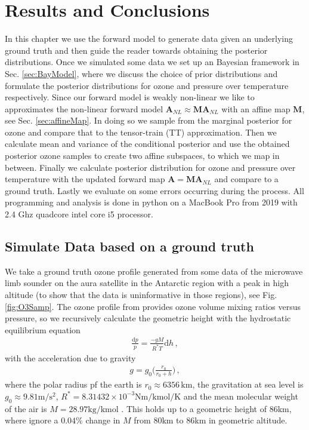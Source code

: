 \chapter{Results and Conclusions}
\label{ch:res}
In this chapter we use the forward model to generate data given an underlying ground truth and then guide the reader towards obtaining the posterior distributions.
Once we simulated some data we set up an Bayesian framework in Sec. \ref{sec:BayModel}, where we discuss the choice of prior distributions and formulate the posterior distributions for ozone and pressure over temperature respectively.
Since our forward model is weakly non-linear we like to approximates the non-linear forward model $\bm{A}_{NL} \approx \bm{M} \bm{A}_{NL}$ with an affine map $\bm{M}$, see Sec. \ref{sec:affineMap}.
In doing so we sample from the marginal posterior for ozone and compare that to the tensor-train (TT) approximation.
Then we calculate mean and variance of the conditional posterior and use the obtained posterior ozone samples to create two affine subspaces, to which we map in between.
Finally we calculate posterior distribution for ozone and pressure over temperature with the updated forward map $\bm{A} = \bm{M} \bm{A}_{NL}$ and compare to a ground truth.
Lastly we evaluate on some errors occurring during the process.
All programming and analysis is done in python on a MacBook Pro from 2019 with 2.4 Ghz quadcore intel core i5 processor.

\section{Simulate Data based on a ground truth}
We take a ground truth ozone profile generated from some data \cite{MLSdata} of the microwave limb sounder on the aura satellite in the Antarctic region with a peak in high altitude (to show that the data is uninformative in those regions), see Fig. \ref{fig:O3Samp}.
The ozone profile from \cite{MLSdata} provides ozone volume mixing ratios versus pressure, so we recursively calculate the geometric height with the hydrostatic equilibrium equation
\begin{align}
	\frac{\text{d}p}{p} = \frac{- g M}{R^* T} \text{d} h \, ,
\end{align}
with the acceleration due to gravity
\begin{align}
	g = g_0 \Bigg( \frac{r_0}{r_0 + h} \Bigg) \, ,
\end{align}
where the polar radius pf the earth is $r_0 \approx 6356 \, \text{km}$, the gravitation at sea level is $g_0 \approx 9.81 \text{m}/\text{s}^2$, $R^* = 8.31432 \times 10^{-3} \text{Nm} / \text{kmol} / \text{K}$ and the mean molecular weight of the air is $M = 28.97 \text{kg/kmol}$ \cite{atmosphere1976us}.
This holds up to a geometric height of $86$km, where ignore a $0.04\%$ change in $M$ from $80$km to $86$km in geometric altitude.

